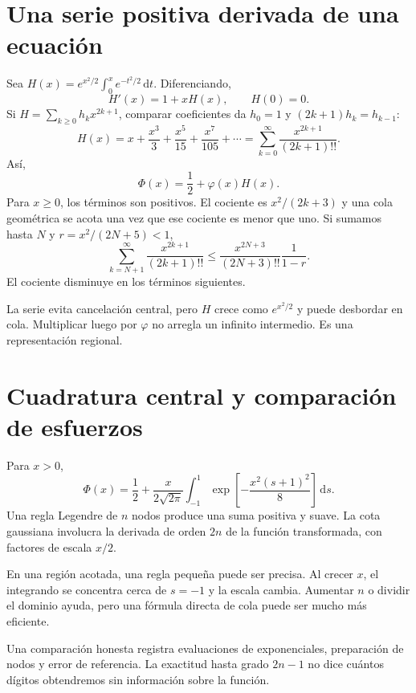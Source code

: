 \documentclass[11pt,a4paper]{article}
\newcommand{\dd}{\,\mathrm d}
\theoremstyle{definition}
\newcommand{\ph}{\varphi}
\begin{document}
\section{Una serie positiva derivada de una ecuación}
Sea $H(x)=e^{x^2/2}\int_0^xe^{-t^2/2}\dd t$. Diferenciando,
\[
H'(x)=1+xH(x),\qquad H(0)=0.
\]
Si $H=\sum_{k\ge0}h_kx^{2k+1}$, comparar coeficientes da
$h_0=1$ y $(2k+1)h_k=h_{k-1}$:
\[
H(x)=x+\frac{x^3}3+\frac{x^5}{15}+\frac{x^7}{105}+\cdots
=\sum_{k=0}^\infty\frac{x^{2k+1}}{(2k+1)!!}.
\]
Así,
\[
\Phi(x)=\frac12+\ph(x)H(x).
\]
Para $x\ge0$, los términos son positivos. El cociente es $x^2/(2k+3)$ y una cola geométrica se acota una vez que ese cociente es menor que uno. Si sumamos hasta $N$ y $r=x^2/(2N+5)<1$,
\[
\sum_{k=N+1}^\infty\frac{x^{2k+1}}{(2k+1)!!}
\le\frac{x^{2N+3}}{(2N+3)!!}\frac1{1-r}.
\]
El cociente disminuye en los términos siguientes.

La serie evita cancelación central, pero $H$ crece como $e^{x^2/2}$ y puede desbordar en cola. Multiplicar luego por $\ph$ no arregla un infinito intermedio. Es una representación regional.

\section{Cuadratura central y comparación de esfuerzos}
Para $x>0$,
\[
\Phi(x)=\frac12+\frac{x}{2\sqrt{2\pi}}
\int_{-1}^1
\exp\left[-\frac{x^2(s+1)^2}{8}\right]\dd s.
\]
Una regla Legendre de $n$ nodos produce una suma positiva y suave. La cota gaussiana involucra la derivada de orden $2n$ de la función transformada, con factores de escala $x/2$.

En una región acotada, una regla pequeña puede ser precisa. Al crecer $x$, el integrando se concentra cerca de $s=-1$ y la escala cambia. Aumentar $n$ o dividir el dominio ayuda, pero una fórmula directa de cola puede ser mucho más eficiente.

Una comparación honesta registra evaluaciones de exponenciales, preparación de nodos y error de referencia. La exactitud hasta grado $2n-1$ no dice cuántos dígitos obtendremos sin información sobre la función.
\end{document}

